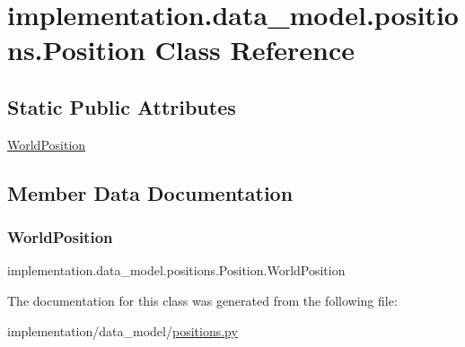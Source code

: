 \hypertarget{classimplementation_1_1data__model_1_1positions_1_1_position}{}\section{implementation.\+data\+\_\+model.\+positions.\+Position Class Reference}
\label{classimplementation_1_1data__model_1_1positions_1_1_position}
\subsection*{Static Public Attributes}
\begin{DoxyCompactItemize}
\item 
\hyperlink{classimplementation_1_1data__model_1_1positions_1_1_position_ab6bf0daf16f6e920f5066551359fbf09}{World\+Position}
\end{DoxyCompactItemize}


\subsection{Member Data Documentation}
\mbox{\label{classimplementation_1_1data__model_1_1positions_1_1_position_ab6bf0daf16f6e920f5066551359fbf09}} 
\subsubsection{\texorpdfstring{World\+Position}{WorldPosition}}
{\footnotesize\ttfamily implementation.\+data\+\_\+model.\+positions.\+Position.\+World\+Position\hspace{0.3cm}{\ttfamily [static]}}



The documentation for this class was generated from the following file\+:\begin{DoxyCompactItemize}
\item 
implementation/data\+\_\+model/\hyperlink{positions_8py}{positions.\+py}\end{DoxyCompactItemize}
